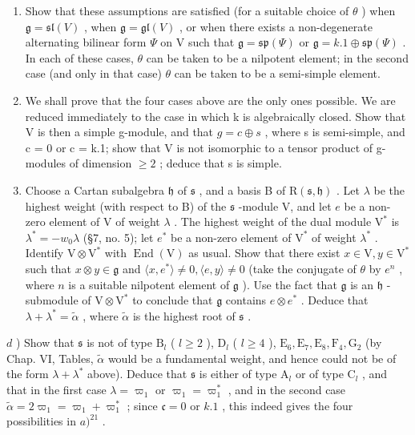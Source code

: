 \begin{enumerate}
\def\labelenumi{\alph{enumi})}
\item
  Show that these assumptions are satisfied (for a suitable choice of \(\theta\) ) when \(\mathfrak{g} = \mathfrak{sl}(V)\) , when \(\mathfrak{g} = \mathfrak{gl}(V)\) , or when there exists a non-degenerate alternating bilinear form \(\varPsi\) on V such that \(\mathfrak{g} = \mathfrak{sp}(\varPsi)\) or \(\mathfrak{g} = k.1 \oplus \mathfrak{sp}(\varPsi)\) . In each of these cases, \(\theta\) can be taken to be a nilpotent element; in the second case (and only in that case) \(\theta\) can be taken to be a semi-simple element.
\item
  We shall prove that the four cases above are the only ones possible. We are reduced immediately to the case in which k is algebraically closed. Show that V is then a simple g-module, and that \(g = c \oplus s\) , where s is semi-simple, and c = 0 or c = k.1; show that V is not isomorphic to a tensor product of g-modules of dimension \(\geq 2\) ; deduce that s is simple.
\item
  Choose a Cartan subalgebra \(\mathfrak{h}\) of \(\mathfrak{s}\) , and a basis B of \(\mathrm{R}(\mathfrak{s},\mathfrak{h})\) . Let \(\lambda\) be the highest weight (with respect to B) of the \(\mathfrak{s}\) -module V, and let \(e\) be a non-zero element of V of weight \(\lambda\) . The highest weight of the dual module \(\mathrm{V}^*\) is \(\lambda^{*} = -w_{0}\lambda\) (§7, no. 5); let \(e^*\) be a non-zero element of \(\mathrm{V}^*\) of weight \(\lambda^*\) . Identify \(\mathrm{V} \otimes \mathrm{V}^*\) with \(\operatorname{End}(\mathrm{V})\) as usual. Show that there exist \(x \in \mathrm{V}, y \in \mathrm{V}^*\) such that \(x \otimes y \in \mathfrak{g}\) and \(\langle x, e^* \rangle \neq 0, \langle e, y \rangle \neq 0\) (take the conjugate of \(\theta\) by \(e^n\) , where \(n\) is a suitable nilpotent element of \(\mathfrak{g}\) ). Use the fact that \(\mathfrak{g}\) is an \(\mathfrak{h}\) -submodule of \(\mathrm{V} \otimes \mathrm{V}^*\) to conclude that \(\mathfrak{g}\) contains \(e \otimes e^*\) . Deduce that \(\lambda + \lambda^{*} = \tilde{\alpha}\) , where \(\tilde{\alpha}\) is the highest root of \(\mathfrak{s}\) .
\end{enumerate}

\(d\) ) Show that \(\mathfrak{s}\) is not of type \(\mathrm{B}_l\) ( \(l\geq 2\) ), \(\mathrm{D}_l\) ( \(l\geq 4\) ), \(\mathrm{E}_6,\mathrm{E}_7,\mathrm{E}_8,\mathrm{F}_4,\mathrm{G}_2\) (by Chap. VI, Tables, \(\tilde{\alpha}\) would be a fundamental weight, and hence could not be of the form \(\lambda +\lambda^{*}\) above). Deduce that \(\mathfrak{s}\) is either of type \(\mathrm{A}_l\) or of type \(\mathrm{C}_l\) , and that in the first case \(\lambda = \varpi_1\) or \(\varpi_1 = \varpi_1^*\) , and in the second case \(\tilde{\alpha} = 2\varpi_1 = \varpi_1 + \varpi_1^*\) ; since \(\mathfrak{c} = 0\) or \(k.1\) , this indeed gives the four possibilities in \(a)^{21}\) .

